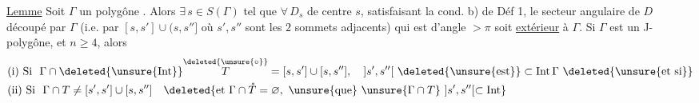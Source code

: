 \uline{Lemme} Soit $\Gamma$ un polygône  . Alors $\exists\,s\in S(\Gamma)$  tel que $\forall\,D_s$ de centre $s$,  satisfaisant la cond. b) de Déf 1, le secteur angulaire de $D$ découpé par $\Gamma$ (i.e. par $[s,s']\cup(s,s'']$ où $s',s''$ sont les $2$ sommets adjacents) qui est d'angle $>\pi$ soit \uline{extérieur} à $\Gamma$. Si $\Gamma$ est un J-polygône, et $n\ge4$, alors
\[
\begin{aligned}
&\text{(i) Si }\ \Gamma\cap\deleted{\unsure{\operatorname{Int}}}\overset{\deleted{\unsure{\circ}}}{T}=[s,s']\cup[s,s''],\quad ]s',s''[\ \deleted{\unsure{\text{est}}}\subset\operatorname{Int}\Gamma\ \text{\deleted{\unsure{et si}}}\\
&\text{(ii) Si }\ \Gamma\cap T\ne[s',s']\cup[s,s'']\quad
\deleted{\text{et }\Gamma\cap\mathring{T}=\varnothing,\ \unsure{\text{que}}\ \unsure{\Gamma\cap T}\ ]s',s''[\subset\operatorname{Int}}
\end{aligned}
\]
